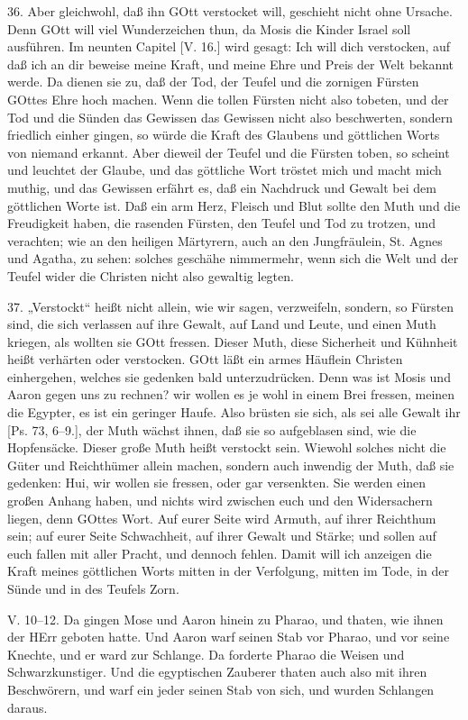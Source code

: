 36. Aber gleichwohl, daß ihn GOtt verstocket will, geschieht nicht ohne Ursache. Denn GOtt will viel Wunderzeichen thun, da Mosis die Kinder Israel soll ausführen. Im neunten Capitel [V. 16.] wird gesagt: Ich will dich verstocken, auf daß ich an dir beweise meine Kraft, und meine Ehre und Preis der Welt bekannt werde. Da dienen sie zu, daß der Tod, der Teufel und die zornigen Fürsten GOttes Ehre hoch machen. Wenn die tollen Fürsten nicht also tobeten, und der Tod und die Sünden das Gewissen das Gewissen nicht also beschwerten, sondern friedlich einher gingen, so würde die Kraft des Glaubens und göttlichen Worts von niemand erkannt. Aber dieweil der Teufel und die Fürsten toben, so scheint und leuchtet der Glaube, und das göttliche Wort tröstet mich und macht mich muthig, und das Gewissen erfährt es, daß ein Nachdruck und Gewalt bei dem göttlichen Worte ist. Daß ein arm Herz, Fleisch und Blut sollte den Muth und die Freudigkeit haben, die rasenden Fürsten, den Teufel und Tod zu trotzen, und verachten; wie an den heiligen Märtyrern, auch an den Jungfräulein, St. Agnes und Agatha, zu sehen: solches geschähe nimmermehr, wenn sich die Welt und der Teufel wider die Christen nicht also gewaltig legten.

37. „Verstockt“ heißt nicht allein, wie wir sagen, verzweifeln, sondern, so Fürsten sind, die sich verlassen auf ihre Gewalt, auf Land und Leute, und einen Muth kriegen, als wollten sie GOtt fressen. Dieser Muth, diese Sicherheit und Kühnheit heißt verhärten oder verstocken. GOtt läßt ein armes Häuflein Christen einhergehen, welches sie gedenken bald unterzudrücken. Denn was ist Mosis und Aaron gegen uns zu rechnen? wir wollen es je wohl in einem Brei fressen, meinen die Egypter, es ist ein geringer Haufe. Also brüsten sie sich, als sei alle Gewalt ihr [Ps. 73, 6–9.], der Muth wächst ihnen, daß sie so aufgeblasen sind, wie die Hopfensäcke. Dieser große Muth heißt verstockt sein. Wiewohl solches nicht die Güter und Reichthümer allein machen, sondern auch inwendig der Muth, daß sie gedenken: Hui, wir wollen sie fressen, oder gar
versenkten. Sie werden einen großen Anhang haben, und nichts wird zwischen euch und den Widersachern liegen, denn GOttes Wort. Auf eurer Seite wird Armuth, auf ihrer Reichthum sein; auf eurer Seite Schwachheit, auf ihrer Gewalt und Stärke; und sollen auf euch fallen mit aller Pracht, und dennoch fehlen. Damit will ich anzeigen die Kraft meines göttlichen Worts mitten in der Verfolgung, mitten im Tode, in der Sünde und in des Teufels Zorn.

\begin{schriftzitat}
V. 10–12. Da gingen Mose und Aaron hinein zu Pharao, und thaten, wie ihnen der HErr geboten hatte. Und Aaron warf seinen Stab vor Pharao, und vor seine Knechte, und er ward zur Schlange. Da forderte Pharao die Weisen und Schwarzkunstiger. Und die egyptischen Zauberer thaten auch also mit ihren Beschwörern, und warf ein jeder seinen Stab von sich, und wurden Schlangen daraus.
\end{schriftzitat}

